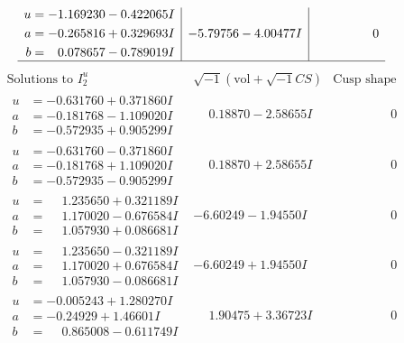 \documentclass[1p]{elsarticle_modified}
\theoremstyle{definition}
\newcommand{\I}{\sqrt{-1}}
\begin{document}
$$\begin{array}{c|c|c}
\begin{aligned}
u &= -1.169230 - 0.422065 I \\
a &= -0.265816 + 0.329693 I \\
b &= \phantom{-}0.078657 - 0.789019 I\end{aligned}
 & -5.79756 - 4.00477 I & \phantom{-0.000000 } 0\\
 \hline 
 \end{array}$$\newpage$$\begin{array}{c|c|c}  
\text{Solutions to }I^u_{2}& \I (\text{vol} + \sqrt{-1}CS) & \text{Cusp shape}\\
 \hline 
\begin{aligned}
u &= -0.631760 + 0.371860 I \\
a &= -0.181768 - 1.109020 I \\
b &= -0.572935 + 0.905299 I\end{aligned}
 & \phantom{-}0.18870 - 2.58655 I & \phantom{-0.000000 } 0 \\ \hline\begin{aligned}
u &= -0.631760 - 0.371860 I \\
a &= -0.181768 + 1.109020 I \\
b &= -0.572935 - 0.905299 I\end{aligned}
 & \phantom{-}0.18870 + 2.58655 I & \phantom{-0.000000 } 0 \\ \hline\begin{aligned}
u &= \phantom{-}1.235650 + 0.321189 I \\
a &= \phantom{-}1.170020 - 0.676584 I \\
b &= \phantom{-}1.057930 + 0.086681 I\end{aligned}
 & -6.60249 - 1.94550 I & \phantom{-0.000000 } 0 \\ \hline\begin{aligned}
u &= \phantom{-}1.235650 - 0.321189 I \\
a &= \phantom{-}1.170020 + 0.676584 I \\
b &= \phantom{-}1.057930 - 0.086681 I\end{aligned}
 & -6.60249 + 1.94550 I & \phantom{-0.000000 } 0 \\ \hline\begin{aligned}
u &= -0.005243 + 1.280270 I \\
a &= -0.24929 + 1.46601 I \\
b &= \phantom{-}0.865008 - 0.611749 I\end{aligned}
 & \phantom{-}1.90475 + 3.36723 I & \phantom{-0.000000 } 0 \\ \hline\begin{aligned}

\end{aligned}
\end{array}$$
\end{document}
